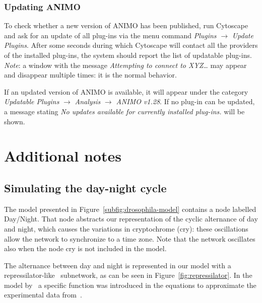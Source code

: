 \subsubsection{Updating ANIMO}
To check whether a new version of ANIMO has been published, run Cytoscape and ask for an update of all
plug-ins via the menu command \emph{Plugins} $\rightarrow$ \emph{Update Plugins}. After some seconds
during which Cytoscape will contact all the providers of the installed plug-ins,
the system should report the list of updatable plug-ins.\\
\emph{Note}: a window with the message \emph{Attempting to connect to XYZ\dots} may appear and disappear multiple times:
it is the normal behavior.

If an updated version of ANIMO is available, it will appear
under the category \emph{Updatable Plugins} $\rightarrow$
\emph{Analysis} $\rightarrow$ \emph{ANIMO v1.28}. If no plug-in can be updated, a message stating \emph{No
updates available for currently installed plug-ins.} will be shown.








\clearpage
\section{Additional notes}

\subsection{Simulating the day-night cycle}\label{suppl:repressilator}
The model presented in Figure~\ref{subfig:drosophila-model} contains a node
labelled {\sf Day/Night}. That node abstracts our representation
of the cyclic alternance of day and night, which causes the variations
in cryptochrome ({\sf cry}): these oscillations allow the network
to synchronize to a time zone. Note that the network oscillates
also when the node {\sf cry} is not included in the model.

The alternance between day and night is represented in our model with a
repressilator-like~\citep{repressilator} subnetwork, as can be seen in Figure~\ref{fig:repressilator}.
In the model by~\cite{drosophila-ode-model} a specific function
was introduced in the equations to approximate the experimental data from~\cite{drosophila-cry-data}.

